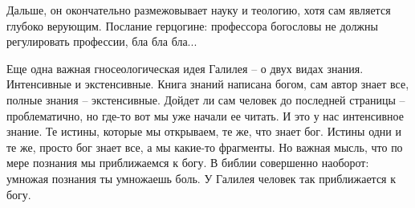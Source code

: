 \documentclass[a4paper, 12pt]{article}
\begin{document}
Дальше, он окончательно размежовывает науку и теологию, хотя сам 
является глубоко верующим. Послание герцогине: профессора богословы не 
должны регулировать профессии, бла бла бла...

Еще одна важная гносеологическая идея Галилея -- о двух видах знания. 
Интенсивные и экстенсивные. Книга знаний написана богом, сам автор знает 
все, полные знания -- экстенсивные. Дойдет ли сам человек до последней 
страницы -- проблематично, но где-то вот мы уже начали ее читать. И это 
у нас интенсивное знание. Те истины, которые мы открываем, те же, что 
знает бог. Истины одни и те же, просто бог знает все, а мы какие-то 
фрагменты. Но важная мысль, что по мере познания мы приближаемся к богу. 
В библии совершенно наоборот: умножая познания ты умножаешь боль. 
У Галилея человек так приближается к богу.
\end{document}
